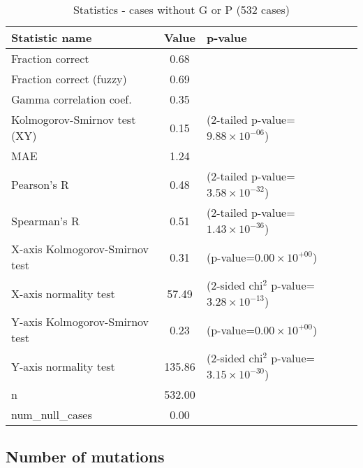 \documentclass[10pt, letterpaper, oneside, titlepage, landscape]{scrreprt}
\begin{document}
\begin{table}[H]\begin{center}
\begin{tabular}{ l S[table-format=3.2] l}
Statistic name & {Value} & p-value\\
\hline
Fraction correct & 0.68 & \\
Fraction correct (fuzzy) & 0.69 & \\
Gamma correlation coef. & 0.35 & \\
Kolmogorov-Smirnov test (XY) & 0.15 & (2-tailed p-value=$9.88\times10^{-06}$)\\
MAE & 1.24 & \\
Pearson's R & 0.48 & (2-tailed p-value=$3.58\times10^{-32}$)\\
Spearman's R & 0.51 & (2-tailed p-value=$1.43\times10^{-36}$)\\
X-axis Kolmogorov-Smirnov test & 0.31 & (p-value=$0.00\times10^{+00}$)\\
X-axis normality test & 57.49 & (2-sided chi$^{2}$ p-value=$3.28\times10^{-13}$)\\
Y-axis Kolmogorov-Smirnov test & 0.23 & (p-value=$0.00\times10^{+00}$)\\
Y-axis normality test & 135.86 & (2-sided chi$^{2}$ p-value=$3.15\times10^{-30}$)\\
n & 532.00 & \\
num\_null\_cases & 0.00 & \\
\end{tabular}
\caption{Statistics - cases without G or P (532 cases)}
\end{center}\end{table}


\subsection{Number of mutations}
\end{document}

